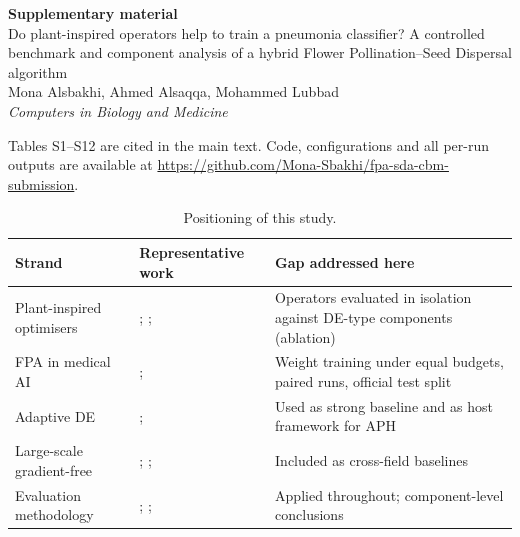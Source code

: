 \documentclass[preprint,12pt]{elsarticle}
\begin{document}
\renewcommand{\thetable}{S\arabic{table}}
\begin{center}{\Large\textbf{Supplementary material}}\\[6pt]
{\large Do plant-inspired operators help to train a pneumonia classifier? A controlled benchmark and component analysis of a hybrid Flower Pollination--Seed Dispersal algorithm}\\[6pt]
Mona Alsbakhi, Ahmed Alsaqqa, Mohammed Lubbad\\[2pt]
\emph{Computers in Biology and Medicine}\end{center}

Tables S1--S12 are cited in the main text. Code, configurations and all per-run outputs are available at \url{https://github.com/Mona-Sbakhi/fpa-sda-cbm-submission}.

\begin{table}[!ht]
\centering
\caption{Positioning of this study.}
\label{tab:taxonomy}
\footnotesize
\begin{tabular}{p{3.0cm}p{3.6cm}p{5.2cm}}
\toprule
Strand & Representative work & Gap addressed here \\
\midrule
Plant-inspired optimisers & \citet{yang2012fpa}; \citet{abdelbasset2019fpareview}; \citet{sulaiman2015sbppa} & Operators evaluated in isolation against DE-type components (ablation) \\
FPA in medical AI & \citet{zhou2025fpaensemble}; \citet{kaya2024fpaanfis} & Weight training under equal budgets, paired runs, official test split \\
Adaptive DE & \citet{zhang2009jade}; \citet{tanabe2013shade,tanabe2014lshade} & Used as strong baseline and as host framework for APH \\
Large-scale gradient-free & \citet{salimans2017es}; \citet{malladi2023mezo}; \citet{qiu2025esllm} & Included as cross-field baselines \\
Evaluation methodology & \citet{derrac2011tutorial}; \citet{demsar2006}; \citet{sorensen2015metaphor} & Applied throughout; component-level conclusions \\
\bottomrule
\end{tabular}
\end{table}














\end{document}
